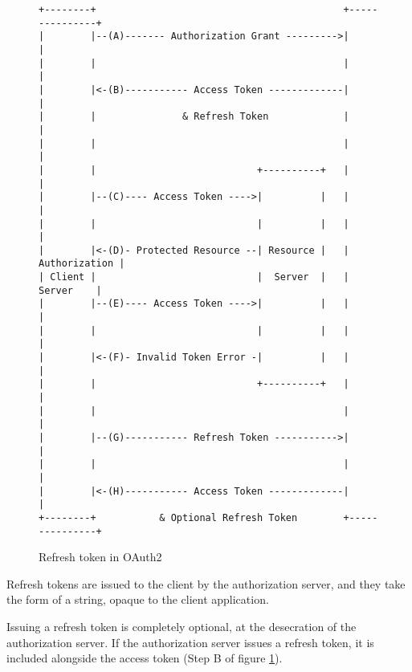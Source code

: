 \begin{figure}[h]
    \centering
    \begin{BVerbatim}
+--------+                                           +---------------+
|        |--(A)------- Authorization Grant --------->|               |
|        |                                           |               |
|        |<-(B)----------- Access Token -------------|               |
|        |               & Refresh Token             |               |
|        |                                           |               |
|        |                            +----------+   |               |
|        |--(C)---- Access Token ---->|          |   |               |
|        |                            |          |   |               |
|        |<-(D)- Protected Resource --| Resource |   | Authorization |
| Client |                            |  Server  |   |     Server    |
|        |--(E)---- Access Token ---->|          |   |               |
|        |                            |          |   |               |
|        |<-(F)- Invalid Token Error -|          |   |               |
|        |                            +----------+   |               |
|        |                                           |               |
|        |--(G)----------- Refresh Token ----------->|               |
|        |                                           |               |
|        |<-(H)----------- Access Token -------------|               |
+--------+           & Optional Refresh Token        +---------------+
    \end{BVerbatim}
    \caption{Refresh token in OAuth2}
    \label{fig:refresh-token-flow}
\end{figure}

Refresh tokens are issued to the client by the authorization server, and they
take the form of a string, opaque to the client application.

Issuing a refresh token is completely optional, at the desecration of the
authorization server.
If the authorization server issues a refresh token, it is included alongside the
access token (Step B of figure \ref{fig:refresh-token-flow}).



